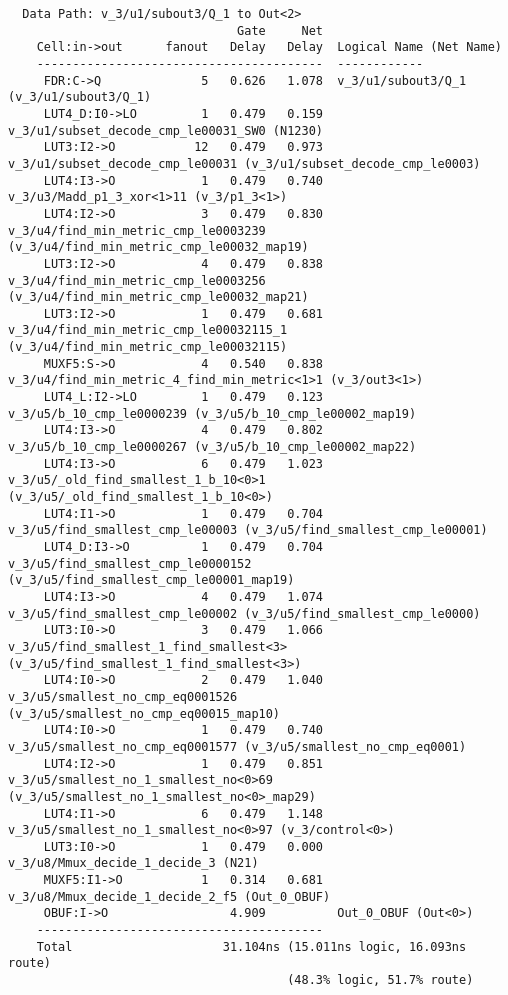 \documentclass[14pt]{report}
\begin{document}
{\begin{verbatim}
  Data Path: v_3/u1/subout3/Q_1 to Out<2>
                                Gate     Net
    Cell:in->out      fanout   Delay   Delay  Logical Name (Net Name)
    ----------------------------------------  ------------
     FDR:C->Q              5   0.626   1.078  v_3/u1/subout3/Q_1 (v_3/u1/subout3/Q_1)
     LUT4_D:I0->LO         1   0.479   0.159  v_3/u1/subset_decode_cmp_le00031_SW0 (N1230)
     LUT3:I2->O           12   0.479   0.973  v_3/u1/subset_decode_cmp_le00031 (v_3/u1/subset_decode_cmp_le0003)
     LUT4:I3->O            1   0.479   0.740  v_3/u3/Madd_p1_3_xor<1>11 (v_3/p1_3<1>)
     LUT4:I2->O            3   0.479   0.830  v_3/u4/find_min_metric_cmp_le0003239 (v_3/u4/find_min_metric_cmp_le00032_map19)
     LUT3:I2->O            4   0.479   0.838  v_3/u4/find_min_metric_cmp_le0003256 (v_3/u4/find_min_metric_cmp_le00032_map21)
     LUT3:I2->O            1   0.479   0.681  v_3/u4/find_min_metric_cmp_le00032115_1 (v_3/u4/find_min_metric_cmp_le00032115)
     MUXF5:S->O            4   0.540   0.838  v_3/u4/find_min_metric_4_find_min_metric<1>1 (v_3/out3<1>)
     LUT4_L:I2->LO         1   0.479   0.123  v_3/u5/b_10_cmp_le0000239 (v_3/u5/b_10_cmp_le00002_map19)
     LUT4:I3->O            4   0.479   0.802  v_3/u5/b_10_cmp_le0000267 (v_3/u5/b_10_cmp_le00002_map22)
     LUT4:I3->O            6   0.479   1.023  v_3/u5/_old_find_smallest_1_b_10<0>1 (v_3/u5/_old_find_smallest_1_b_10<0>)
     LUT4:I1->O            1   0.479   0.704  v_3/u5/find_smallest_cmp_le00003 (v_3/u5/find_smallest_cmp_le00001)
     LUT4_D:I3->O          1   0.479   0.704  v_3/u5/find_smallest_cmp_le0000152 (v_3/u5/find_smallest_cmp_le00001_map19)
     LUT4:I3->O            4   0.479   1.074  v_3/u5/find_smallest_cmp_le00002 (v_3/u5/find_smallest_cmp_le0000)
     LUT3:I0->O            3   0.479   1.066  v_3/u5/find_smallest_1_find_smallest<3> (v_3/u5/find_smallest_1_find_smallest<3>)
     LUT4:I0->O            2   0.479   1.040  v_3/u5/smallest_no_cmp_eq0001526 (v_3/u5/smallest_no_cmp_eq00015_map10)
     LUT4:I0->O            1   0.479   0.740  v_3/u5/smallest_no_cmp_eq0001577 (v_3/u5/smallest_no_cmp_eq0001)
     LUT4:I2->O            1   0.479   0.851  v_3/u5/smallest_no_1_smallest_no<0>69 (v_3/u5/smallest_no_1_smallest_no<0>_map29)
     LUT4:I1->O            6   0.479   1.148  v_3/u5/smallest_no_1_smallest_no<0>97 (v_3/control<0>)
     LUT3:I0->O            1   0.479   0.000  v_3/u8/Mmux_decide_1_decide_3 (N21)
     MUXF5:I1->O           1   0.314   0.681  v_3/u8/Mmux_decide_1_decide_2_f5 (Out_0_OBUF)
     OBUF:I->O                 4.909          Out_0_OBUF (Out<0>)
    ----------------------------------------
    Total                     31.104ns (15.011ns logic, 16.093ns route)
                                       (48.3% logic, 51.7% route)


\end{verbatim}}
\end{document}
